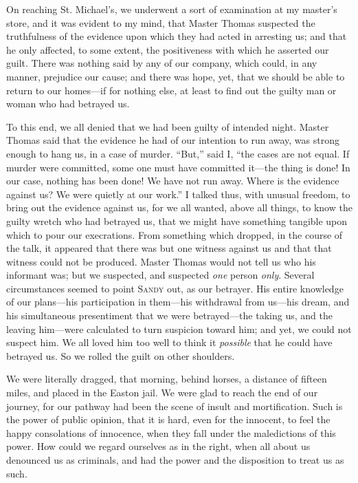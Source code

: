 On reaching St. Michael's, we underwent a sort of examination at my
master's store, and it was evident to my mind, that Master Thomas
suspected the truthfulness of the evidence upon which they had acted in
arresting us; and that he only affected, to some extent, the
positiveness with which he asserted our guilt. There was nothing said by
any of our company, which {\protect\hypertarget{297}{}{}}could, in any
manner, prejudice our cause; and there was hope, yet, that we should be
able to return to our homes---if for nothing else, at least to find out
the guilty man or woman who had betrayed us.

To this end, we all denied that we had been guilty of intended night.
Master Thomas said that the evidence he had of our intention to run
away, was strong enough to hang us, in a case of murder. ``But,'' said
I, ``the cases are not equal. If murder were committed, some one must
have committed it---the thing is done! In our case, nothing has been
done! We have not run away. Where is the evidence against us? We were
quietly at our work.'' I talked thus, with unusual freedom, to bring out
the evidence against us, for we all wanted, above all things, to know
the guilty wretch who had betrayed us, that we might have something
tangible upon which to pour our execrations. From something which
dropped, in the course of the talk, it appeared that there was but one
witness against us and that that witness could not be produced. Master
Thomas would not tell us who his informant was; but we suspected, and
suspected \emph{one} person \emph{only}. Several circumstances seemed to
point \textsc{Sandy} out, as our betrayer. His entire knowledge of our
plans---his participation in them---his withdrawal from us---his dream,
and his simultaneous presentiment that we were betrayed---the taking us,
and the leaving him---were calculated to turn suspicion toward him; and
yet, we could not suspect him. We all loved him too well to think it
\emph{possible} that he could have betrayed us. So we rolled the guilt
on other shoulders.

{\protect\hypertarget{298}{}{}}We were literally dragged, that morning,
behind horses, a distance of fifteen miles, and placed in the Easton
jail. We were glad to reach the end of our journey, for our pathway had
been the scene of insult and mortification. Such is the power of public
opinion, that it is hard, even for the innocent, to feel the happy
consolations of innocence, when they fall under the maledictions of this
power. How could we regard ourselves as in the right, when all about us
denounced us as criminals, and had the power and the disposition to
treat us as such.

